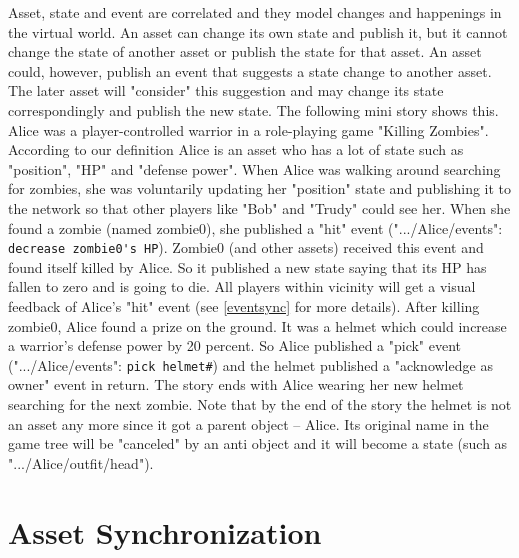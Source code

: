 Asset, state and event are correlated and they model changes and happenings in the virtual world. An asset can change its own state and publish it, but it cannot change the state of another asset or publish the state for that asset. An asset could, however, publish an event that suggests a state change to another asset. The later asset will "consider" this suggestion and may change its state correspondingly and publish the new state. The following mini story shows this. Alice was a player-controlled warrior in a role-playing game "Killing Zombies". According to our definition Alice is an asset who has a lot of state such as "{position}", "{HP}" and "{defense power}". When Alice was walking around searching for zombies, she was voluntarily updating her "{position}" state and publishing it to the network so that other players like "{Bob}" and "{Trudy}" could see her. When she found a zombie (named zombie0), she published a "hit" event ("{.../Alice/events}": \verb|decrease zombie0's HP|). Zombie0 (and other assets) received this event and found itself killed by Alice. So it published a new state saying that its HP has fallen to zero and is going to die. All players within vicinity will get a visual feedback of Alice's "hit" event (see \ref{eventsync} for more details). After killing zombie0, Alice found a prize on the ground. It was a helmet which could increase a warrior's defense power by 20 percent. So Alice published a "pick" event ("{.../Alice/events}": \verb|pick helmet#|) and the helmet published a "acknowledge as owner" event in return. The story ends with Alice wearing her new helmet searching for the next zombie. Note that by the end of the story the helmet is not an asset any more since it got a parent object -- Alice. Its original name in the game tree will be "canceled" by an anti object and it will become a state (such as "{.../Alice/outfit/head}").




\section{Asset Synchronization}
\label{assetsync}


